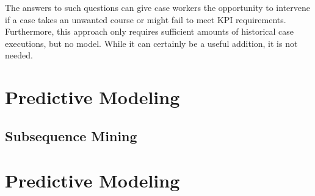 The answers to such questions can give case workers the opportunity to intervene if a case takes an unwanted course or might fail to meet KPI requirements. Furthermore, this approach only requires sufficient amounts of historical case executions, but no model. While it can certainly be a useful addition, it is not needed. 


\section{Predictive Modeling}
\subsection{Subsequence Mining}

\section{Predictive Modeling}
